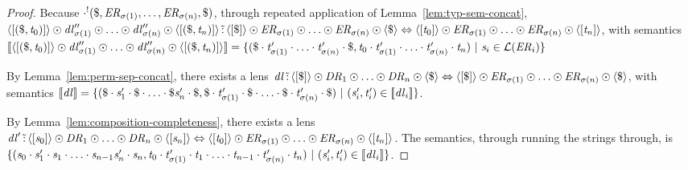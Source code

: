 \documentclass[numbers,10pt,preprint\ifanon ,nocopyrightspace\fi]{sigplanconf}
\begin{document}
\begin{proof}
  Because
  $\cdot^!(\$,\mathit{ER}_{\sigma(1)},\ldots,\mathit{ER}_{\sigma(n)},\$)$,
  through repeated application of
  Lemma~\ref{lem:typ-sem-concat},
  $\langle[(\$,\mathit{t}_0)]\rangle \odot \mathit{dl}_{\sigma(1)}'' \odot
  \ldots \odot \mathit{dl}_{\sigma(n)}'' \odot
  \langle[(\$,\mathit{t}_n)]\rangle \,\tilde{:}\,
  \langle[\$]\rangle \odot \mathit{ER}_{\sigma(1)} \odot \ldots
  \odot \mathit{ER}_{\sigma(n)} \odot \langle\$\rangle
  \Leftrightarrow
  \langle[\mathit{t}_0]\rangle \odot \mathit{ER}_{\sigma(1)} \odot \ldots
  \odot \mathit{ER}_{\sigma(n)} \odot \langle[\mathit{t}_n]\rangle$, with semantics
  $[ \! [\langle[(\$,\mathit{t}_0)]\rangle \odot \mathit{dl}_{\sigma(1)}'' \odot
    \ldots \odot \mathit{dl}_{\sigma(n)}'' \odot
    \langle[(\$,\mathit{t}_n)]\rangle] \! ] =
  \{(\$\cdot\mathit{t}_{\sigma(1)}'\cdot\ldots\cdot\mathit{t}_{\sigma(n)}'\cdot\$,
    \mathit{t}_0\cdot\mathit{t}_{\sigma(1)}'\cdot\ldots\cdot\mathit{t}_{\sigma(n)}'\cdot\mathit{t}_n) ~|~
    \mathit{s}_i\in\mathcal{L}(\mathit{ER}_i)\}$
  
  By Lemma~\ref{lem:perm-sep-concat},
  there exists a lens $\mathit{dl} \,\tilde{:}\, \langle[\$]\rangle \odot \mathit{DR}_1 \odot \ldots
  \odot \mathit{DR}_n \odot \langle\$\rangle \Leftrightarrow
  \langle[\$]\rangle \odot \mathit{ER}_{\sigma(1)} \odot \ldots
  \odot \mathit{ER}_{\sigma(n)} \odot \langle\$\rangle$, with semantics
  $[ \! [\mathit{dl}] \! ] = \{(\$\cdot\mathit{s}_1'\cdot\$\cdot\ldots\cdot\$\mathit{s}_n'\cdot\$,
    \$\cdot\mathit{t}_{\sigma(1)}'\cdot\$\cdot\ldots\cdot\$\cdot\mathit{t}_{\sigma(n)}'\cdot\$)
    ~|~
    (\mathit{s}_i',\mathit{t}_i') \in [ \! [\mathit{dl}_i] \! ]\}$.

  By Lemma~\ref{lem:composition-completeness},
  there exists a lens $\mathit{dl}' \,\tilde{:}\, \langle[\mathit{s}_0]\rangle \odot \mathit{DR}_1 \odot \ldots
  \odot \mathit{DR}_n \odot \langle[\mathit{s}_n]\rangle
  \Leftrightarrow
  \langle[\mathit{t}_0]\rangle \odot \mathit{ER}_{\sigma(1)} \odot \ldots
  \odot \mathit{ER}_{\sigma(n)} \odot
  \langle[\mathit{t}_n]\rangle$.
  The semantics, through running the strings through, is $\{(\mathit{s}_0\cdot\mathit{s}_1'\cdot\mathit{s}_1\cdot\ldots\cdot\mathit{s}_{n-1}\mathit{s}_n'\cdot\mathit{s}_n,
    \mathit{t}_0\cdot\mathit{t}_{\sigma(1)}'\cdot\mathit{t}_1\cdot\ldots\cdot\mathit{t}_{n-1}\cdot\mathit{t}_{\sigma(n)}'\cdot\mathit{t}_n)
    ~|~
  (\mathit{s}_i',\mathit{t}_i') \in [ \! [\mathit{dl}_i] \! ]\}$.
\end{proof}
\end{document}
